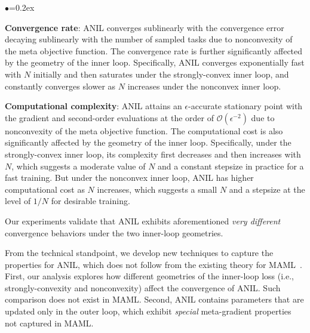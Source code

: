 \documentclass{osudissert96}
\begin{document}
\begin{list}{$\bullet$}{\topsep=0.2ex \leftmargin=0.26in \rightmargin=0.1in \itemsep =0.05in}

\item {\bf Convergence rate}: ANIL converges sublinearly with the convergence error decaying sublinearly with the number of sampled tasks due to nonconvexity of the meta objective function. The convergence rate is further significantly affected by the geometry of the inner loop. Specifically, ANIL converges exponentially fast with $N$ initially and then saturates under the strongly-convex inner loop, and constantly converges slower as $N$ increases under the nonconvex inner loop.

\item {\bf Computational complexity}: ANIL attains an $\epsilon$-accurate stationary point with the gradient and second-order evaluations at the order of $\mathcal{O}(\epsilon^{-2})$ due to nonconvexity of the meta objective function. The computational cost is also significantly affected by the geometry of the inner loop. Specifically, under the strongly-convex inner loop, its complexity first decreases and then increases with $N$, which suggests a moderate value of $N$ and a constant stepsize in practice for a fast training. But under the nonconvex inner loop, ANIL has higher computational cost as $N$ increases, which suggests a small $N$ and a stepsize at the level of $1/N$ for desirable training. 


\item Our experiments validate that ANIL exhibits aforementioned {\em very different} convergence behaviors under the two inner-loop geometries.

\end{list}
From the technical standpoint, we develop new techniques to capture the properties for ANIL, which does not follow from the existing theory for MAML~\cite{fallah2019convergence,ji2020multi}. First, our analysis explores how different geometries of the inner-loop loss (i.e., strongly-convexity and nonconvexity) affect the convergence of ANIL. Such comparison does not exist in MAML. Second, ANIL contains parameters that are updated only in the outer loop, which exhibit {\em special} meta-gradient properties not captured in MAML.
\end{document}
